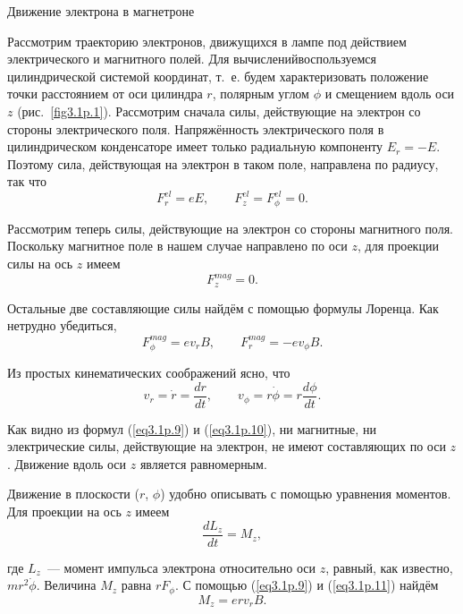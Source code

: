 {\LARGE Движение электрона в магнетроне}

Рассмотрим траекторию электронов, движущихся в лампе под действием электрического и магнитного полей. Для вычисленийвоспользуемся цилиндрической системой координат, т.~е. будем характеризовать положение точки расстоянием от оси цилиндра $r$, полярным углом $\phi$ и смещением вдоль оси $z$ (рис.~\ref{fig3.1p.1}). Рассмотрим сначала силы, действующие на электрон со стороны электрического поля. Напряжённость электрического поля в цилиндрическом конденсаторе имеет только радиальную компоненту $E_r=-E$. Поэтому сила, действующая на электрон в таком поле, направлена по радиусу, так что
\begin{equation}
F_r^{el}=eE,\qquad F_z^{el}=F_{\phi}^{el}=0.
\label{eq3.1p.9}
\end{equation}

Рассмотрим теперь силы, действующие на электрон со стороны магнитного поля. Поскольку магнитное поле в нашем случае
направлено по оси $z$, для проекции силы на ось $z$ имеем
\begin{equation}
F_z^{mag}=0.
\label{eq3.1p.10}
\end{equation}

Остальные две составляющие силы найдём с помощью формулы Лоренца. Как нетрудно убедиться,
\begin{equation}
F_{\phi}^{mag}=ev_rB,\qquad F_{r}^{mag}=-ev_{\phi}B.
\label{eq3.1p.11}
\end{equation}

Из простых кинематических соображений ясно, что
\begin{equation}
v_r=\dot{r}=\frac{dr}{dt},\qquad v_{\phi}=r\dot{\phi}=r\frac{d\phi}{dt}.
\label{eq3.1p.12}
\end{equation}

Как видно из формул (\ref{eq3.1p.9}) и (\ref{eq3.1p.10}), ни магнитные, ни электрические силы, действующие на электрон, не имеют составляющих по оси $z$. Движение вдоль оси $z$ является равномерным.

Движение в плоскости ($r$, $\phi$) удобно описывать с помощью уравнения моментов. Для проекции на ось $z$ имеем
\begin{equation}
\frac{dL_{z}}{dt}=M_z,
\label{eq3.1p.13}
\end{equation}

где $L_{z}$~--- момент импульса электрона относительно оси $z$, равный, как известно, $mr^2\dot{\phi}$. Величина $M_z$ равна $rF_{\phi}$. С помощью (\ref{eq3.1p.9}) и (\ref{eq3.1p.11}) найдём
\begin{equation}
M_z=erv_rB.
\label{eq3.1p.14}
\end{equation}

